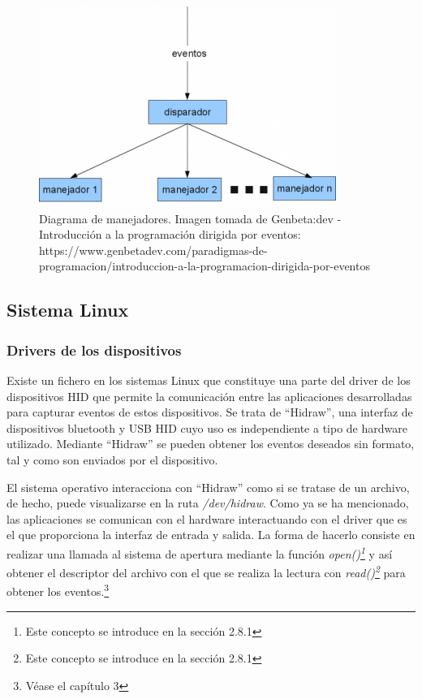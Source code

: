 \begin{figure}
\centering
\includegraphics[scale = 0.7]{capitulo_02/figuras_dir/disparador.jpg}
\caption{Diagrama de manejadores. Imagen tomada de Genbeta:dev - Introducción a la programación dirigida por eventos: https://www.genbetadev.com/paradigmas-de-programacion/introduccion-a-la-programacion-dirigida-por-eventos}
\end{figure}

\subsection{Sistema Linux} \label{s2_1_3}

\subsubsection{Drivers de los dispositivos}\label{s2_1_3_1}

Existe un fichero en los sistemas Linux que constituye una parte del driver de los dispositivos HID que permite la comunicación entre las aplicaciones desarrolladas para capturar eventos de estos dispositivos. Se trata de ``Hidraw'', una interfaz de dispositivos bluetooth y USB HID cuyo uso es independiente a tipo de hardware utilizado. Mediante ``Hidraw'' se pueden obtener los eventos deseados sin formato, tal y como son enviados por el dispositivo. 

El sistema operativo interacciona con ``Hidraw'' como si se tratase de un archivo, de hecho, puede visualizarse en la ruta {\itshape/dev/hidraw}. Como ya se ha mencionado, las aplicaciones se comunican con el hardware interactuando con el driver que es el que proporciona la interfaz de entrada y salida. La forma de hacerlo consiste en realizar una llamada al sistema de apertura mediante la función {\itshape open()\footnote{Este concepto se introduce en la sección 2.8.1}} y así obtener el descriptor del archivo con el que se realiza la lectura con {\itshape read()\footnote{Este concepto se introduce en la sección 2.8.1}} para obtener los eventos.\footnote{Véase el capítulo 3}

